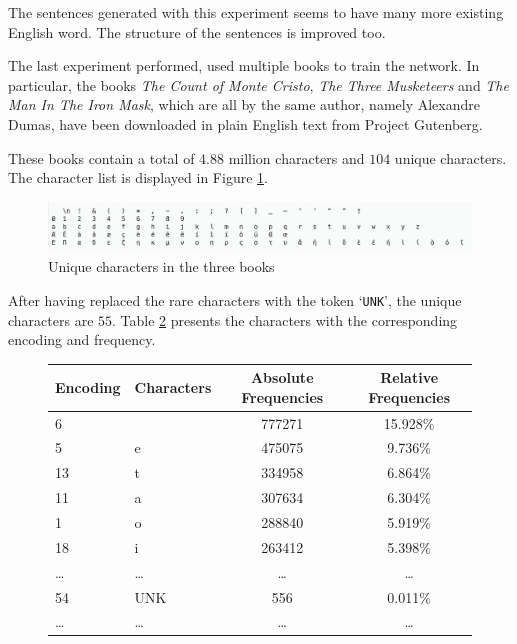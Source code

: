 \documentclass[a4paper,12pt]{article} %
\begin{document}
	The sentences generated with this experiment seems to have many more 
	existing English word. The structure of the sentences is improved too. 
	
	\bigskip
	The last experiment performed, used multiple books to train the network. In 
	particular, the books \textit{The Count of Monte Cristo}, \textit{The Three 
	Musketeers} and \textit{The Man In The Iron Mask}, which are all by the 
	same author, namely Alexandre Dumas, have been downloaded in plain English 
	text from Project Gutenberg.
	
	These books contain a total of 4.88 million characters and $104$ unique 
	characters. The character list is displayed in Figure \ref{fig:multibooks}.
	
	\begin{figure}[htb]
		\centering
		\includegraphics[width=\linewidth]{multibooks.png}	
		\caption{Unique characters in the three books}
		\label{fig:multibooks}
	\end{figure}
	
	After having replaced the rare characters with the token `\texttt{UNK}', 
	the unique characters are $55$. 
	Table \ref{tab:statistics3} presents the characters with the corresponding 
	encoding and frequency.
	
	\begin{figure}[htb]
		\centering
		\begin{tabular}{llcc}
			\toprule
			Encoding & Characters &  Absolute Frequencies & Relative 
			Frequencies \\
			\midrule
			6        &           &                777271 &              
			15.928\% \\
			5        &         e &                475075 &               
			9.736\% \\
			13       &         t &                334958 &               
			6.864\% \\
			11       &         a &                307634 &               
			6.304\% \\
			1        &         o &                288840 &               
			5.919\% \\
			18       &         i &                263412 &               
			5.398\% \\
			\dots       &         \dots &                \dots 
			&             \dots \\
			54       &       UNK &                   556 &               
			0.011\% \\
			\dots       &         \dots &                \dots 
			&             \dots \\
			\bottomrule
		\end{tabular}
		\label{tab:statistics3}
	\end{figure}
\end{document}
